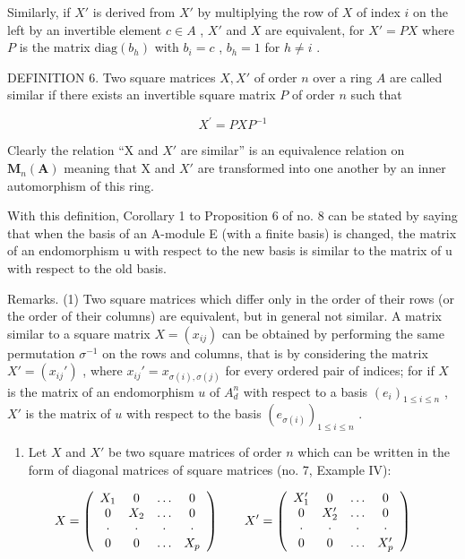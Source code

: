 Similarly, if \(X'\) is derived from \(X'\) by multiplying the row of \(X\) of index \(i\) on the left by an invertible element \(c \in A\) , \(X'\) and \(X\) are equivalent, for \(X' = PX\) where \(P\) is the matrix \(\text{diag}(b_h)\) with \(b_i = c\) , \(b_h = 1\) for \(h \neq i\) .

DEFINITION 6. Two square matrices \(X, X'\) of order \(n\) over a ring \(A\) are called similar if there exists an invertible square matrix \(P\) of order \(n\) such that

\[
X ^ {\prime} = P X P ^ {- 1}\tag{41}
\]

Clearly the relation ``X and \(X'\) are similar'' is an equivalence relation on \(\mathbf{M}_{n}(\mathbf{A})\) meaning that X and \(X'\) are transformed into one another by an inner automorphism of this ring.

With this definition, Corollary 1 to Proposition 6 of no. 8 can be stated by saying that when the basis of an A-module E (with a finite basis) is changed, the matrix of an endomorphism u with respect to the new basis is similar to the matrix of u with respect to the old basis.

Remarks. (1) Two square matrices which differ only in the order of their rows (or the order of their columns) are equivalent, but in general not similar. A matrix similar to a square matrix \(X = (x_{ij})\) can be obtained by performing the same permutation \(\sigma^{-1}\) on the rows and columns, that is by considering the matrix \(X' = (x_{ij}')\) , where \(x_{ij}' = x_{\sigma(i),\sigma(j)}\) for every ordered pair of indices; for if \(X\) is the matrix of an endomorphism \(u\) of \(A_d^n\) with respect to a basis \((e_i)_{1 \leq i \leq n}\) , \(X'\) is the matrix of \(u\) with respect to the basis \((e_{\sigma(i)})_{1 \leq i \leq n}\) .

\begin{enumerate}
\def\labelenumi{(\arabic{enumi})}
\setcounter{enumi}{1}
\tightlist
\item
  Let \(X\) and \(X'\) be two square matrices of order \(n\) which can be written in the form of diagonal matrices of square matrices (no. 7, Example IV):
\end{enumerate}

\[
X = \left( \begin{array}{c c c c} X _ {1} & 0 & \ldots & 0 \\ 0 & X _ {2} & \ldots & 0 \\ \cdot & \cdot & \cdot & \cdot \\ 0 & 0 & \ldots & X _ {p} \end{array} \right) \qquad X ^ {\prime} = \left( \begin{array}{c c c c} X _ {1} ^ {\prime} & 0 & \ldots & 0 \\ 0 & X _ {2} ^ {\prime} & \ldots & 0 \\ \cdot & \cdot & \cdot & \cdot \\ 0 & 0 & \ldots & X _ {p} ^ {\prime} \end{array} \right)
\]

